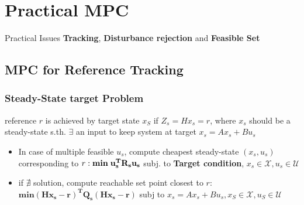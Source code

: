 \section{Practical MPC}
Practical Issues \textbf{Tracking}, \textbf{Disturbance rejection} and \textbf{Feasible Set}
\subsection{MPC for Reference Tracking}
\subsubsection{Steady-State target Problem}
reference $r$ is achieved by target state $x_S$ if $Z_s = Hx_s = r$, where $x_s$ should be a steady-state s.th. $\exists$ an input to keep system at target $x_s = Ax_s + Bu_s$\\
\begin{itemize}
    \item In case of multiple feasible $u_s$, compute cheapest steady-state $(x_s,u_s)$ corresponding to $r: \mathbf{min \hspace{1mm} u_s^TR_su_s}$ subj. to \textbf{Target condition}, $x_s\in \mathcal{X},u_s \in \mathcal{U}$
    \item if $\nexists$ solution, compute reachable set point closest to $r$: 
    $\mathbf{min(Hx_s-r)^TQ_s(Hx_s-r)}$ subj to $x_s=Ax_s+Bu_s, x_S \in \mathcal{X}, u_S \in \mathcal{U}$
\end{itemize}
\vfill\null\columnbreak
